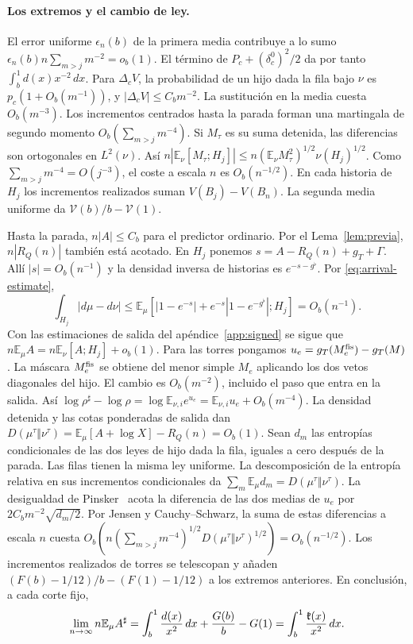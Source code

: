 \paragraph{Los extremos y el cambio de ley.}
El error uniforme \(\epsilon_n(b)\) de la primera media contribuye a lo sumo
\(\epsilon_n(b)n\sum_{m>j}m^{-2}=o_b(1)\). El término de \(P_c+(\delta_c^0)^2/2\)
da por tanto \(\int_b^1d(x)x^{-2}\,dx\). Para \(\Delta_cV\), la probabilidad de un hijo
dada la fila bajo \(\nu\) es \(p_c(1+O_b(m^{-1}))\), y \(|\Delta_cV|\le C_bm^{-2}\).
La sustitución en la media cuesta \(O_b(m^{-3})\). Los incrementos centrados hasta la parada
forman una martingala de segundo momento \(O_b(\sum_{m>j}m^{-4})\).
Si \(M_\tau\) es su suma detenida, las diferencias son ortogonales en \(L^2(\nu)\).
Así \(n|\mathbb E_\nu[M_\tau;H_j]|\le n(\mathbb E_\nu M_\tau^2)^{1/2}\nu(H_j)^{1/2}\).
Como \(\sum_{m>j}m^{-4}=O(j^{-3})\), el coste a escala \(n\) es \(O_b(n^{-1/2})\).
En cada historia de \(H_j\) los incrementos realizados suman \(V(B_j)-V(B_n)\).
La segunda media uniforme da \(\mathcal V(b)/b-\mathcal V(1)\).

Hasta la parada, \(n|A|\le C_b\) para el predictor ordinario. Por el Lema~\ref{lem:previa},
\(n|R_Q(n)|\) también está acotado. En \(H_j\) ponemos
\(s=A-R_Q(n)+g_T+\Gamma\). Allí \(|s|=O_b(n^{-1})\) y la densidad inversa de historias
es \(e^{-s-g^\flat}\). Por \eqref{eq:arrival-estimate},
\[
 \int_{H_j}|d\mu-d\nu|
 \le\mathbb E_\mu[|1-e^{-s}|+e^{-s}|1-e^{-g^\flat}|;H_j]=O_b(n^{-1}) .
\]
Con las estimaciones de salida del apéndice~\ref{app:signed} se sigue que
\(n\mathbb E_\mu A=n\mathbb E_\nu[A;H_j]+o_b(1)\).
Para las torres pongamos \(u_e=g_T(M_e^{\rm fis})-g_T(M)\).
La máscara \(M_e^{\rm fis}\) se obtiene del menor simple \(M_e\) aplicando los dos vetos
diagonales del hijo. El cambio es \(O_b(m^{-2})\), incluido el paso que entra en la salida.
Así \(\log\rho^\sharp-\log\rho=\log\mathbb E_{\nu,i}e^{u_e}
 =\mathbb E_{\nu,i}u_e+O_b(m^{-4})\).
La densidad detenida y las cotas ponderadas de salida dan
\(D(\mu^\tau\Vert\nu^\tau)=\mathbb E_\mu[A+\log X]-R_Q(n)=O_b(1)\).
Sean \(d_m\) las entropías condicionales de las dos leyes de hijo dada la fila,
iguales a cero después de la parada. Las filas tienen la misma ley uniforme.
La descomposición de la entropía relativa en sus incrementos condicionales da
\(\sum_m\mathbb E_\mu d_m=D(\mu^\tau\Vert\nu^\tau)\). La desigualdad de
Pinsker~\cite{ct} acota la diferencia de las dos medias de \(u_e\) por \(2C_bm^{-2}\sqrt{d_m/2}\).
Por Jensen y Cauchy--Schwarz, la suma de estas diferencias a escala \(n\) cuesta
\(O_b(n(\sum_{m>j}m^{-4})^{1/2}D(\mu^\tau\Vert\nu^\tau)^{1/2})=O_b(n^{-1/2})\).
Los incrementos realizados de torres se telescopan y añaden
\((F(b)-1/12)/b-(F(1)-1/12)\) a los extremos anteriores. En conclusión, a cada corte fijo,
\[
 \lim_{n\to\infty} n\mathbb E_\mu A^\sharp
 =\int_b^1\frac{d(x)}{x^2}\,dx+\frac{G(b)}b-G(1)
 =\int_b^1\frac{\mathfrak{k}(x)}{x^2}\,dx .
\]
